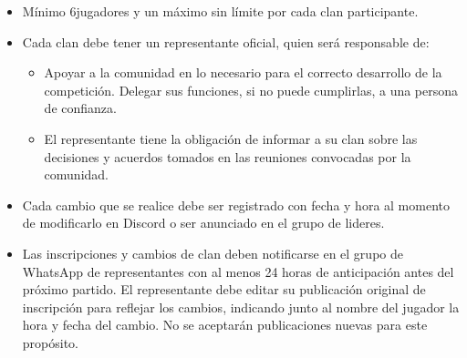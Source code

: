 \begin{itemize}
    \item Mínimo 6jugadores y un máximo sin límite por cada clan participante.
    \item Cada clan debe tener un representante oficial, quien será responsable de:
    \begin{itemize}
        \item Apoyar a la comunidad en lo necesario para el correcto desarrollo de la competición.
        Delegar sus funciones, si no puede cumplirlas, a una persona de confianza.
        \item El representante tiene la obligación de informar a su clan sobre las decisiones y acuerdos tomados en las reuniones convocadas por la comunidad.
    \end{itemize} 
            
    \item Cada cambio que se realice debe ser registrado con fecha y hora al momento de modificarlo en Discord o ser anunciado en el grupo de lideres. 
    \item Las inscripciones y cambios de clan deben notificarse en el grupo de WhatsApp de representantes con al menos 24 horas de anticipación antes del próximo partido.
    El representante debe editar su publicación original de inscripción para reflejar los cambios, indicando junto al nombre del jugador la hora y fecha del cambio. No se aceptarán publicaciones nuevas para este propósito.
\end{itemize}